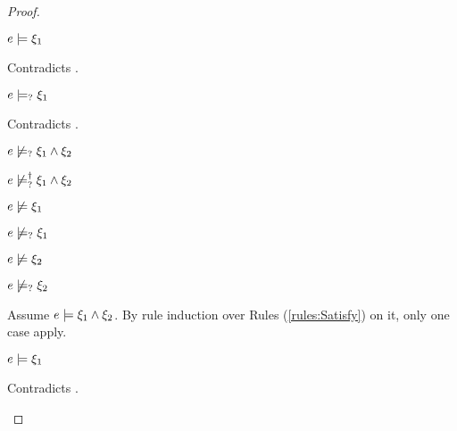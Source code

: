 \begin{proof}
\begin{byCases}
\begin{byCases}
\begin{byCases}
        \item[\text{(\ref{rule:CMSAnd2})}]
            \begin{pfsteps*}
            \item $e \models \xi_1$ 
            \end{pfsteps*}
            Contradicts .
        \item[\text{(\ref{rule:CMSAnd3})}]
            \begin{pfsteps*}
            \item $e \models_{?} \xi_1$ 
            \end{pfsteps*}
            Contradicts .
        \end{byCases}
        \begin{pfsteps*}
        \item $e \not\models_{?} \xi_1 \wedge \xi_2$  
        \item $e \not\models_{?}^{\dag} \xi_1 \wedge \xi_2$ 
        \end{pfsteps*}
    \item[\cnotsatisfyormay{e}{\xi_1},\cnotsatisfyormay{e}{\xi_2}]
        \begin{pfsteps*}
        \item $e \not\models \xi_1$  
        \item $e \not\models_{?} \xi_1$  
        \item $e \not\models \xi_2$  
        \item $e \not\models_{?} \xi_2$  
        \end{pfsteps*}
        Assume $e \models \xi_1 \wedge \xi_2$. By rule induction over Rules (\ref{rules:Satisfy}) on it, only one case apply.
        \begin{byCases}
        \item[\text{(\ref{rule:CSAnd})}]
            \begin{pfsteps*}
            \item $e \models \xi_1$ 
            \end{pfsteps*}
            Contradicts .

\end{byCases}
\end{byCases}
\end{byCases}
\end{proof}
